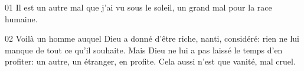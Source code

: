 01 Il est un autre mal que j’ai vu sous le soleil, un grand mal pour la race humaine.

02 Voilà un homme auquel Dieu a donné d’être riche, nanti, considéré: rien ne lui manque de tout ce qu’il souhaite. Mais Dieu ne lui a pas laissé le temps d’en profiter: un autre, un étranger, en profite. Cela aussi n’est que vanité, mal cruel.
